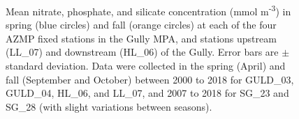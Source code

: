 \documentclass[12pt]{article}\usepackage[]{graphicx}\usepackage[]{color}
\begin{document}
\begin{landscapepage}
\begin{figure}[htb]

{\centering {} 

}

\caption{Mean nitrate, phosphate, and silicate concentration (mmol m\textsuperscript{-3}) in spring (blue circles) and fall (orange circles) at each of the four AZMP fixed stations in the Gully MPA, and stations upstream (LL\_07) and downstream (HL\_06) of the Gully. Error bars are \(\pm\) standard deviation. Data were collected in the spring (April) and fall (September and October) between 2000 to 2018 for GULD\_03, GULD\_04, HL\_06, and LL\_07, and 2007 to 2018 for SG\_23 and SG\_28 (with slight variations between seasons).}\label{fig:figure22}
\end{figure}
\end{landscapepage}
\clearpage
\end{document}
